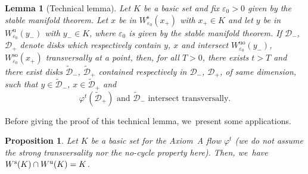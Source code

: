 \documentclass[11pt]{article}
\newcommand{\rs}{\mathrm{s}}
\newcommand{\rso}{\mathrm{so}}
\newcommand{\ru}{\mathrm{u}}
\newcommand{\ruo}{\mathrm{uo}}
\theoremstyle{definition}
\theoremstyle{plain}
\newtheorem{prop}[definition]{Proposition}
\newtheorem{lemma}[definition]{Lemma}
\newcommand{\D}{\mathcal{D}}
\begin{document}
\begin{appendix}
\begin{lemma}[Technical lemma]\label{lemma: technical lemma appendix}
Let $K$ be a basic set and fix $\varepsilon_0 > 0$ given by the stable manifold theorem. Let $x$ be in $W_{\varepsilon_0}^\rs (x_+)$ with $x_+ \in K$ and let $y$ be in $W_{\varepsilon_0}^\ru (y_-)$ with $y_- \in K$, where $\varepsilon_0$ is given by the stable manifold theorem. If $\D_-$, $\D_+$ denote disks which respectively contain $y$, $x$ and intersect $W_{\varepsilon_0}^{\ruo} (y_-)$, $W_{\varepsilon_0}^{\rso} (x_+)$ transversally at a point, then, for all $T > 0$, there exists $t > T$ and there exist disks $\widetilde{\D}_-$, $\widetilde{\D}_+$ contained respectively in $\D_-$, $\D_+$, of same dimension, such that $y \in \widetilde{\D}_-$, $x \in \widetilde{\D}_+$ and
\[
\varphi^t (\widetilde{\D}_{+}) \text{ and } \widetilde{\D}_{-} \text{ intersect transversally}.
\]
\end{lemma}

Before giving the proof of this technical lemma, we~present some applications.

\begin{prop}\label{Appendix: prop intersection stable unstable sets of basic sets}
Let $K$ be a basic set for the Axiom~A flow $\varphi^t$ (we do not assume the strong transversality nor the no-cycle property here). Then, we~have $W^\rs (K) \cap\nobreak W^\ru (K) = K$.
\end{prop}


\end{appendix}
\end{document}
